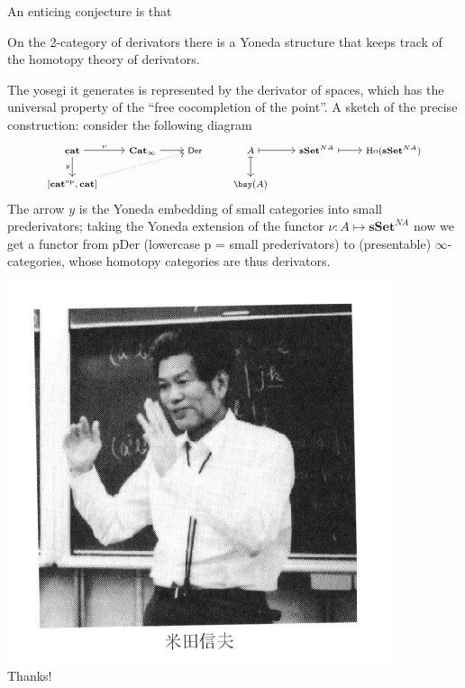 \documentclass{beamer}
\begin{document}
\begin{frame}
	An enticing conjecture is that
	\begin{block}{}
		On the 2-category of \alert{derivators} there is a Yoneda structure that keeps track of the homotopy theory of derivators.
	\end{block}
	The yosegi it generates is represented by the derivator of spaces, which has the universal property of the ``free cocompletion of the point''. \onslide<3-> A sketch of the precise construction: consider the following diagram
	\[\scriptsize\begin{tikzcd}[ampersand replacement=\&]
			\caat \arrow[r, "\nu"] \arrow[d, "y"'] \& \Cat_\infty \arrow[r] \& \textsf{Der} \& A \arrow[r, maps to] \arrow[d, maps to] \& {\bf sSet}^{NA} \arrow[r, maps to] \& \text{Ho}({\bf sSet}^{NA}) \\
			{[\caat^\op,\caat]} \arrow[rru, dotted] \&  \&  \& \bsy(A) \&  \&
		\end{tikzcd}\]
	\onslide<4->
	The arrow $y$ is the Yoneda embedding of small categories into small prederivators; taking the Yoneda extension of the functor $\nu : A\mapsto \textbf{sSet}^{NA}$ now we get a functor from pDer (lowercase p = small prederivators) to (presentable) $\infty$-categories, whose homotopy categories are thus derivators.
\end{frame}
\begin{frame}
	\centering\includegraphics[width=.4\textwidth]{yoneda.png}\\
	\Huge Thanks!
\end{frame}
\end{document}
